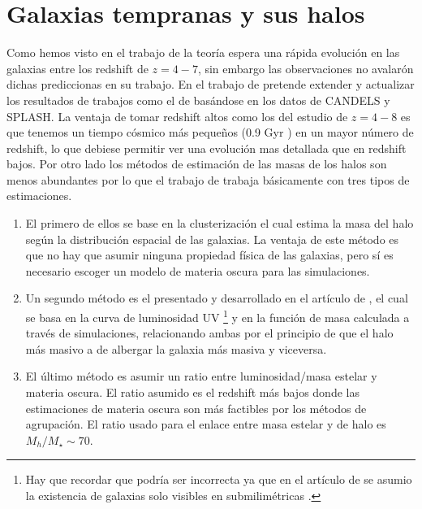 \documentclass{article}
\begin{document}
\section{Galaxias tempranas y sus halos}
Como hemos visto en el trabajo de \cite{finkelstein2015increasing} la teoría espera una rápida evolución en las galaxias entre los redshift de $z=4-7$, sin embargo las observaciones no avalarón dichas prediccionas en su trabajo. En el trabajo de \cite{steinhardt2016impossibly} pretende extender y actualizar los resultados de trabajos como el de \cite{finkelstein2015increasing} basándose en los datos de CANDELS y SPLASH. La ventaja de tomar redshift altos como los del estudio de $z=4-8$ es que tenemos un tiempo cósmico más pequeños (0.9 Gyr \citep{steinhardt2016impossibly}) en un mayor número de redshift, lo que debiese permitir ver una evolución mas detallada que en redshift bajos. Por otro lado los métodos de estimación de las masas de los halos son menos abundantes por lo que el trabajo de \cite{steinhardt2016impossibly} trabaja básicamente con tres tipos de estimaciones.
\begin{enumerate}
\item El primero de ellos se base en la clusterización \citep{hildebrandt2009cars} el cual estima la masa del halo según la distribución espacial de las galaxias. La ventaja de este método es que no hay que asumir ninguna propiedad física de las galaxias, pero sí es necesario escoger un modelo de materia oscura para las simulaciones.
\item Un segundo método es el presentado y desarrollado en el artículo de \cite{finkelstein2015increasing}, el cual se basa en la curva de luminosidad UV \footnote{Hay que recordar que podría ser incorrecta ya que en el artículo de se asumio la existencia de galaxias solo visibles en submilimétricas \citep{wang2019dominant}.} y en la función de masa calculada a través de simulaciones, relacionando ambas por el principio de que el halo más masivo a de albergar la galaxia más masiva y viceversa.
\item El último método es asumir un ratio entre luminosidad/masa estelar y materia oscura. El ratio asumido es el redshift más bajos donde las estimaciones de materia oscura son más factibles por los métodos de agrupación. El ratio usado para el enlace entre masa estelar y de halo es  $M_h/M_\star \sim 70 $.
\end{enumerate}
\end{document}
